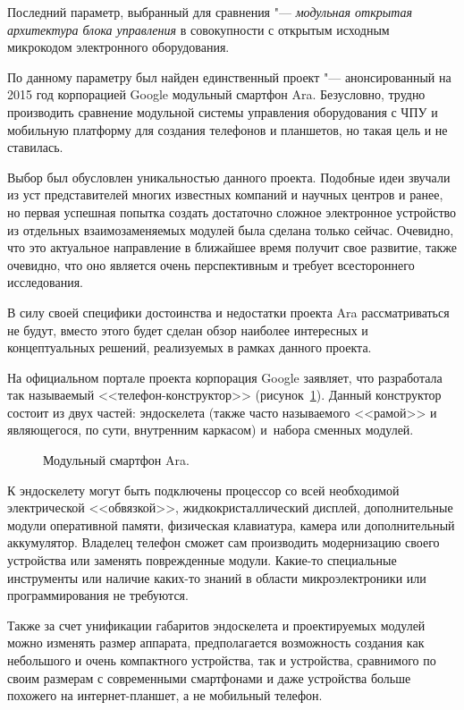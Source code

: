 Последний параметр, выбранный для сравнения "--- \textit{модульная открытая архитектура блока управления} в совокупности с открытым исходным микрокодом электронного оборудования.

По данному параметру был найден единственный проект "--- анонсированный на 2015 год корпорацией Google модульный смартфон Ara. Безусловно, трудно производить сравнение модульной системы управления оборудования с ЧПУ и мобильную платформу для создания телефонов и планшетов, но такая цель и не ставилась.

Выбор был обусловлен уникальностью данного проекта. Подобные идеи звучали из уст представителей многих известных компаний и научных центров и ранее, но первая успешная попытка создать достаточно сложное электронное устройство из отдельных взаимозаменяемых модулей была сделана только сейчас. Очевидно, что это актуальное направление в ближайшее время получит свое развитие, также очевидно, что оно является очень перспективным и требует всестороннего исследования.

В силу своей специфики достоинства и недостатки проекта Ara рассматриваться не будут, вместо этого будет сделан обзор наиболее интересных и концептуальных решений, реализуемых в рамках данного проекта.

На официальном портале проекта корпорация Google заявляет, что разработала так называемый <<телефон-конструктор>> (рисунок~\cref{fig:ara}). Данный конструктор состоит из двух частей: эндоскелета (также часто называемого <<рамой>> и являющегося, по сути, внутренним каркасом) и~набора сменных модулей.

\begin{figure}[ht]
	\caption{Модульный смартфон Ara.}\label{fig:ara}
\end{figure}

К эндоскелету могут быть подключены процессор со всей необходимой электрической <<обвязкой>>, жидкокристаллический дисплей, дополнительные модули оперативной памяти, физическая клавиатура, камера или дополнительный аккумулятор. Владелец телефон сможет сам производить модернизацию своего устройства или заменять поврежденные модули. Какие-то специальные инструменты или наличие каких-то знаний в области микроэлектроники или программирования не требуются.

Также за счет унификации габаритов эндоскелета и проектируемых модулей можно изменять размер аппарата, предполагается возможность создания как небольшого и очень компактного устройства, так и устройства, сравнимого по своим размерам с современными смартфонами и даже устройства больше похожего на интернет-планшет, а не мобильный телефон.


